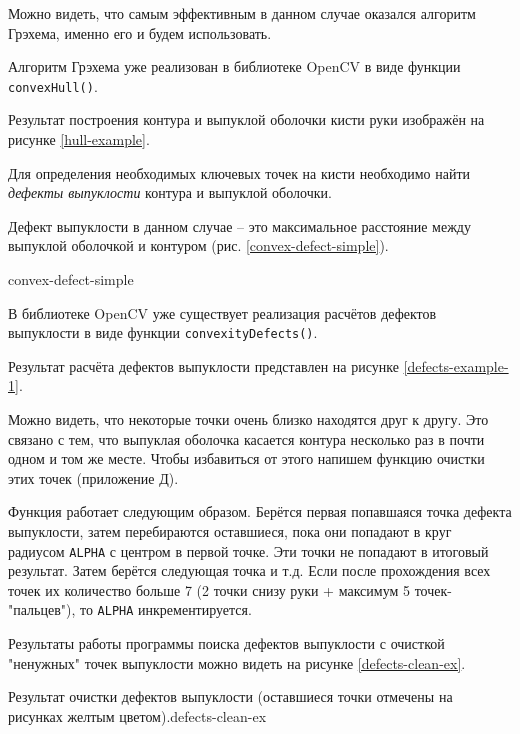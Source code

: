 Можно видеть, что самым эффективным в данном случае оказался алгоритм
Грэхема, именно его и будем использовать.

Алгоритм Грэхема уже реализован в библиотеке OpenCV в виде функции
{\tt convexHull()}.

Результат построения контура и выпуклой оболочки кисти руки
изображён на рисунке 
\ref{hull-example}.


Для определения необходимых ключевых точек на кисти необходимо 
найти {\it дефекты выпуклости} контура и выпуклой оболочки. 

Дефект выпуклости в данном случае -- это максимальное расстояние
между выпуклой оболочкой и контуром (рис. \ref{convex-defect-simple}).

{convex-defect-simple}

В библиотеке OpenCV уже существует реализация расчётов дефектов 
выпуклости в виде функции {\tt convexityDefects()}. 

Результат расчёта дефектов выпуклости представлен на рисунке \ref{defects-example-1}.


Можно видеть, что некоторые точки очень близко находятся друг к другу.
Это связано с тем, что выпуклая оболочка касается контура 
несколько раз в почти одном и том же месте. Чтобы избавиться от
этого напишем функцию очистки этих точек (приложение Д).

Функция работает следующим образом. Берётся первая попавшаяся точка
дефекта выпуклости, затем перебираются оставшиеся, пока они попадают
в круг радиусом {\tt ALPHA} с центром в первой точке. Эти точки не
попадают в итоговый результат. Затем берётся следующая точка и т.д.
Если после прохождения всех точек их количество больше 7 (2 точки
снизу руки + максимум 5 точек-"пальцев"), то {\tt ALPHA}
инкрементируется.

Результаты работы программы поиска дефектов выпуклости с 
очисткой "ненужных" точек выпуклости можно видеть на рисунке
\ref{defects-clean-ex}.

{Результат очистки дефектов выпуклости (оставшиеся точки 
отмечены на рисунках желтым цветом).}{defects-clean-ex}

